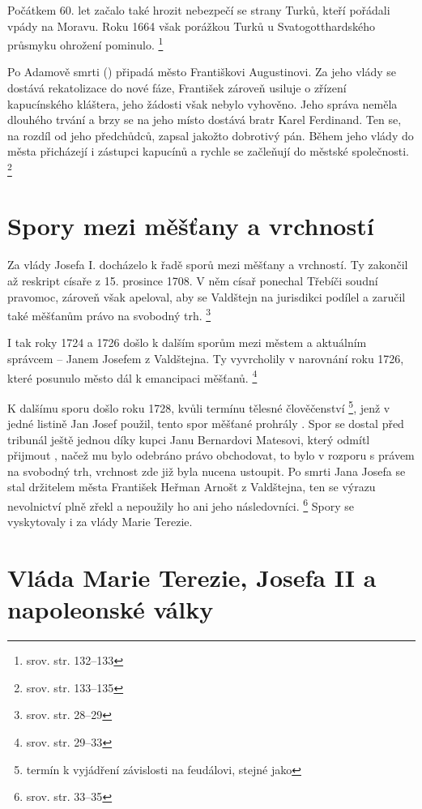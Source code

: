 \documentclass[a4paper,oneside,12pt]{report}
\begin{document}
Počátkem 60. let začalo také hrozit nebezpečí se strany Turků, kteří pořádali vpády na Moravu.
Roku 1664 však porážkou Turků u Svatogotthardského průsmyku ohrožení pominulo. \footnote{srov. \cite{Uhlir1978} str. 132--133}

Po Adamově smrti () připadá město Františkovi Augustinovi.
Za jeho vlády se dostává rekatolizace do nové fáze, František zároveň usiluje o zřízení kapucínského kláštera, jeho žádosti však nebylo vyhověno.
Jeho správa neměla dlouhého trvání a brzy se na jeho místo dostává bratr Karel Ferdinand.
Ten se, na rozdíl od jeho předchůdců, zapsal jakožto dobrotivý pán.
Během jeho vlády do města přicházejí i zástupci kapucínů a rychle se začleňují do městské společnosti. \footnote{srov. \cite{Uhlir1978} str. 133--135}

\section{Spory mezi měšťany a vrchností}

Za vlády Josefa I. docházelo k řadě sporů mezi měšťany a vrchností.
Ty zakončil až reskript císaře z 15. prosince 1708.
V něm císař ponechal Třebíči soudní pravomoc, zároveň však apeloval, aby se Valdštejn na jurisdikci podílel a zaručil také měšťanům právo na svobodný trh. \footnote{srov.  str. 28--29}

I tak roky 1724 a 1726 došlo k dalším sporům mezi městem a aktuálním správcem -- Janem Josefem z Valdštejna.
Ty vyvrcholily v narovnání roku 1726, které posunulo město dál k emancipaci měšťanů. \footnote{srov. \cite{Janak1981} str. 29--33}

K dalšímu sporu došlo roku 1728, kvůli termínu tělesné člověčenství \footnote{termín k vyjádření závislosti na feudálovi, stejné jako }, jenž v jedné listině Jan Josef použil, tento spor měšťané prohrály .
Spor se dostal před tribunál ještě jednou díky kupci Janu Bernardovi Matesovi, který odmítl přijmout , načež mu bylo odebráno právo obchodovat, to bylo v rozporu s právem na svobodný trh, vrchnost zde již byla nucena ustoupit.
Po smrti Jana Josefa se stal držitelem města František Heřman Arnošt z Valdštejna, ten se výrazu nevolnictví plně zřekl a nepoužily ho ani jeho následovníci. \footnote{srov. \cite{Janak1981} str. 33--35}
Spory se vyskytovaly i za vlády Marie Terezie.

\section{Vláda Marie Terezie, Josefa II a napoleonské války}
\end{document}
